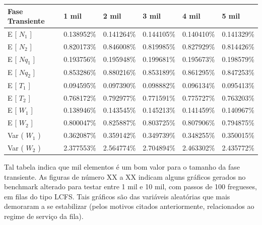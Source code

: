 \documentclass[a4paper,10pt]{article}
\begin{document}
\begin{center}
\begin{tabular} { | l | l | l | l | l | l | }
    \hline
    Fase Transiente & 1 mil      & 2 mil      & 3 mil      & 4 mil      & 5 mil     \\ \hline
    E [ $N_1$ ]     & 0.138952\% & 0.141264\% & 0.144105\% & 0.140410\% & 0.141329\% \\ \hline
    E [ $N_2$ ]     & 0.820173\% & 0.846008\% & 0.819985\% & 0.827929\% & 0.814426\% \\ \hline
    E [ $Nq_1$ ]    & 0.193756\% & 0.195948\% & 0.199681\% & 0.195673\% & 0.198579\% \\ \hline
    E [ $Nq_2$ ]    & 0.853286\% & 0.880216\% & 0.853189\% & 0.861295\% & 0.847253\% \\ \hline
    E [ $T_1$ ]     & 0.094595\% & 0.097390\% & 0.098882\% & 0.096134\% & 0.095413\% \\ \hline
    E [ $T_2$ ]     & 0.768172\% & 0.792977\% & 0.771591\% & 0.775727\% & 0.763203\% \\ \hline
    E [ $W_1$ ]     & 0.138946\% & 0.143545\% & 0.145213\% & 0.141459\% & 0.140967\% \\ \hline
    E [ $W_2$ ]     & 0.800047\% & 0.825887\% & 0.803725\% & 0.807906\% & 0.794875\% \\ \hline
    Var ( $W_1$ )   & 0.362087\% & 0.359142\% & 0.349739\% & 0.348255\% & 0.350015\% \\ \hline
    Var ( $W_2$ )   & 2.377553\% & 2.564774\% & 2.704894\% & 2.463302\% & 2.435772\% \\ \hline
\end{tabular}
\end{center}

    Tal tabela indica que mil elementos é um bom valor para o tamanho da fase transiente. As figuras de número XX a XX indicam alguns gráficos gerados no benchmark alterado para testar entre 1 mil e 10 mil, com passos de 100 fregueses, em filas do tipo LCFS. Tais gráficos são das variáveis aleatórias que mais demoraram a se estabilizar (pelos motivos citados anteriormente, relacionados ao regime de serviço da fila).

\pagebreak
\end{document}
